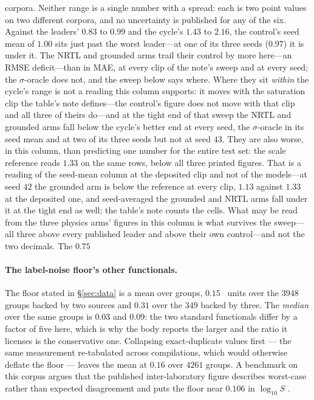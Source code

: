 corpora. Neither range is a single number with a spread: each is two point values on two different
corpora, and no uncertainty is published for any of the six.
Against the leaders' $0.83$ to $0.99$ and the cycle's
$1.43$ to $2.16$, the control's seed mean of $1.00$ sits just past the worst
leader---at one of its three seeds ($0.97$) it is under it. The NRTL and grounded arms
trail their control by more here---an RMSE deficit---than in MAE, at every clip of the
note's sweep and at every seed; the $\sigma$-oracle does not, and the sweep below says
where. Where
they sit \emph{within} the cycle's range is not a reading
this column supports: it moves with the saturation clip the table's note defines---the control's figure
does not move with that clip and all three of theirs do---and at the tight end of that sweep the
NRTL and grounded arms fall below the cycle's better end at every seed, the $\sigma$-oracle in its
seed mean and at two of its three seeds but not at seed $43$. They are also worse, in
this column, than predicting one number for the entire test set: the scale reference reads $1.33$ on
the same rows, below all three printed figures. That is a reading of the seed-mean column at the
deposited clip and not of the models---at seed $42$ the grounded arm is below the reference at every
clip, $1.13$ against $1.33$ at the deposited one, and seed-averaged the grounded and NRTL arms fall
under it at the tight end as well; the table's note counts the cells.
What may be read from the three physics arms' figures in this column is what survives the
sweep---all three above every published leader and above their own control---and not the two
decimals. The $0.75$
\paragraph{The label-noise floor's other functionals.} The floor stated in \S\ref{sec:data} is a
mean over groups, $0.15$ \lnx\ units over the $3948$ groups backed by two sources and $0.31$ over
the $349$ backed by three. The \emph{median} over the same groups is $0.03$ and $0.09$: the two
standard functionals differ by a factor of five here, which is why the body reports the larger and
the ratio it licenses is the conservative one. Collapsing exact-duplicate values first --- the same
measurement re-tabulated across compilations, which would otherwise deflate the floor --- leaves the
mean at $0.16$ over $4261$ groups. A benchmark on this corpus argues that the published
inter-laboratory figure describes worst-case rather than expected disagreement and puts the floor
near $0.106$ in $\log_{10}S$ \cite{sc3benchmark}.

